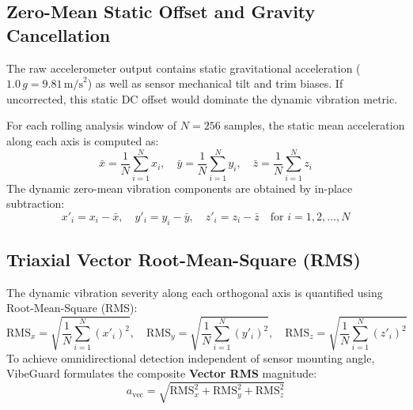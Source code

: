 \subsection{Zero-Mean Static Offset and Gravity Cancellation}
\hspace{2em}The raw accelerometer output contains static gravitational acceleration ($1.0\,g = 9.81\,\text{m/s}^2$) as well as sensor mechanical tilt and trim biases. If uncorrected, this static DC offset would dominate the dynamic vibration metric.

For each rolling analysis window of $N = 256$ samples, the static mean acceleration along each axis is computed as:
\begin{equation}
\bar{x} = \frac{1}{N}\sum_{i=1}^{N} x_i, \quad \bar{y} = \frac{1}{N}\sum_{i=1}^{N} y_i, \quad \bar{z} = \frac{1}{N}\sum_{i=1}^{N} z_i
\label{eq:dc_mean}
\end{equation}
The dynamic zero-mean vibration components are obtained by in-place subtraction:
\begin{equation}
x'_i = x_i - \bar{x}, \quad y'_i = y_i - \bar{y}, \quad z'_i = z_i - \bar{z} \quad \text{for } i = 1, 2, \dots, N
\label{eq:dc_removal}
\end{equation}

\subsection{Triaxial Vector Root-Mean-Square (RMS)}
\hspace{2em}The dynamic vibration severity along each orthogonal axis is quantified using Root-Mean-Square (RMS):
\begin{equation}
\mathrm{RMS}_x = \sqrt{\frac{1}{N}\sum_{i=1}^{N} (x'_i)^2}, \quad \mathrm{RMS}_y = \sqrt{\frac{1}{N}\sum_{i=1}^{N} (y'_i)^2}, \quad \mathrm{RMS}_z = \sqrt{\frac{1}{N}\sum_{i=1}^{N} (z'_i)^2}
\label{eq:axis_rms}
\end{equation}
To achieve omnidirectional detection independent of sensor mounting angle, VibeGuard formulates the composite \textbf{Vector RMS} magnitude:
\begin{equation}
a_{\mathrm{vec}} = \sqrt{\mathrm{RMS}_x^2 + \mathrm{RMS}_y^2 + \mathrm{RMS}_z^2}
\label{eq:vector_rms}
\end{equation}


